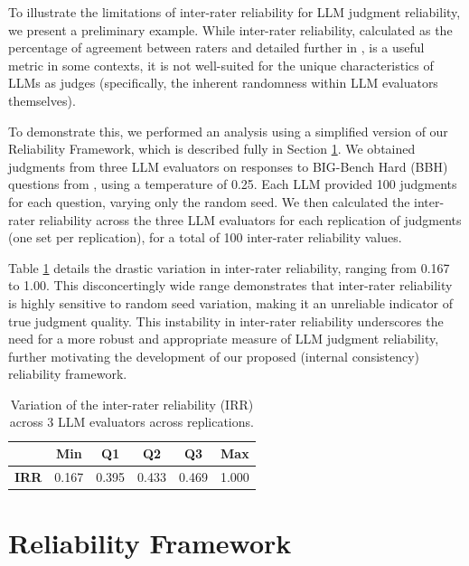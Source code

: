 \documentclass[11pt]{article}
\begin{document}
To illustrate the limitations of inter-rater reliability for LLM judgment reliability, we present a preliminary example. While inter-rater reliability, calculated as the percentage of agreement between raters and detailed further in \citep{hallgren2012computing}, is a useful metric in some contexts, it is not well-suited for the unique characteristics of LLMs as judges (specifically, the inherent randomness within LLM evaluators themselves). 

To demonstrate this, we performed an analysis using a simplified version of our Reliability Framework, which is described fully in Section \ref{sec:framework}. We obtained judgments from three LLM evaluators on responses to BIG-Bench Hard (BBH) questions from \citet{suzgun2022challenging}, using a temperature of 0.25. Each LLM provided 100 judgments for each question, varying only the random seed. We then calculated the inter-rater reliability across the three LLM evaluators for each replication of judgments (one set per replication), for a total of 100 inter-rater reliability values.

Table \ref{tab:irr} details the drastic variation in inter-rater reliability, ranging from 0.167 to 1.00. This disconcertingly wide range demonstrates that inter-rater reliability is highly sensitive to random seed variation, making it an unreliable indicator of true judgment quality. This instability in inter-rater reliability underscores the need for a more robust and appropriate measure of LLM judgment reliability, further motivating the development of our proposed (internal consistency) reliability framework. 


\begin{table}[t]
    \centering
    \begin{tabular}{cccccc}
         & \textbf{Min} & \textbf{Q1} & \textbf{Q2} & \textbf{Q3} & \textbf{Max} \\
         \midrule
         \textbf{IRR} & 0.167 & 0.395 & 0.433 & 0.469 & 1.000\\
        \bottomrule
    \end{tabular}
    \caption{Variation of the inter-rater reliability (IRR) across 3 LLM evaluators across replications.}
    \label{tab:irr}
\end{table}



\section{Reliability Framework}
\label{sec:framework}
\end{document}
